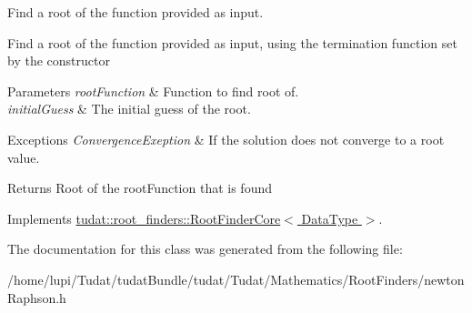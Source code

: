 Find a root of the function provided as input. 

Find a root of the function provided as input, using the termination function set by the constructor 
\begin{DoxyParams}{Parameters}
{\em root\+Function} & Function to find root of. \\
\hline
{\em initial\+Guess} & The initial guess of the root. \\
\hline
\end{DoxyParams}

\begin{DoxyExceptions}{Exceptions}
{\em Convergence\+Exeption} & If the solution does not converge to a root value. \\
\hline
\end{DoxyExceptions}
\begin{DoxyReturn}{Returns}
Root of the root\+Function that is found 
\end{DoxyReturn}


Implements \hyperlink{classtudat_1_1root__finders_1_1RootFinderCore_a1fcd710906f66ebea649c83f08c2ae97}{tudat\+::root\+\_\+finders\+::\+Root\+Finder\+Core$<$ Data\+Type $>$}.



The documentation for this class was generated from the following file\+:\begin{DoxyCompactItemize}
\item 
/home/lupi/\+Tudat/tudat\+Bundle/tudat/\+Tudat/\+Mathematics/\+Root\+Finders/newton\+Raphson.\+h\end{DoxyCompactItemize}
